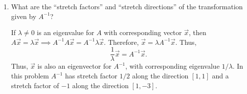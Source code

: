 \documentclass[letter]{article}
\newcommand{\R}{\mathbb{R}}
\newcommand{\mat}[1]{\begin{bmatrix}#1\end{bmatrix}}
\newenvironment{answer}{
	\begin{adjustwidth}{8mm}{} \vspace{2mm}}{\end{adjustwidth} \vspace{2mm}
}
\theoremstyle{plain}
\theoremstyle{definition}
\theoremstyle{remark}
\begin{document}
\begin{enumerate}
\begin{enumerate}
\begin{answer}
\[			\left[\begin{array}{cc|cc}
				1 & 3 & 8 & 0 \\
				0 & -32 & -72 & 8
			\end{array}\right] \sim 
			\left[\begin{array}{cc|cc}
				1 & 3 & 8 & 0 \\
				9 & -5 & 0 & 8
			\end{array}\right]
			\]
			Further reduction gives
			\[
			\sim \left[\begin{array}{cc|cc}
				1 & 3 & 8 & 0 \\
				9 & -5 & 0 & 8
			\end{array}\right] \sim 
			\left[\begin{array}{cc|cc}
				1 & 0 & 5/4 & 3/4 \\
				0 & 1 & 9/4 & -1/4
			\end{array}\right] \implies 
			A^{-1} = \mat{5/4 & 3/4 \\ 9/4 & -1/4}.
			\]
			\end{answer}
			\item What are the ``stretch factors'' and ``stretch directions'' of the transformation given by $A^{-1}$?
			\begin{answer}
				If $\lambda \neq 0$ is an eigenvalue for $A$ with corresponding vector $\vec{x}$, then $A\vec{x} = \lambda \vec{x} \implies A^{-1} A \vec{x} = A^{-1} \lambda \vec{x}$. Therefore, $\vec{x} = \lambda A^{-1} \vec{x}$. Thus, 
				\[
				\frac{1}{\lambda} \vec{x} = A^{-1} \vec{x}.
				\]
				Thus, $\vec{x}$ is also an eigenvector for $A^{-1}$, with corresponding eigenvalue $1/\lambda$. In this problem $A^{-1}$ has stretch factor $1/2$ along the direction $[1,1]$ and a stretch factor of $-1$ along the direction $[1,-3]$. 
			\end{answer}
		\end{enumerate}

		

\end{enumerate}
\end{document}
